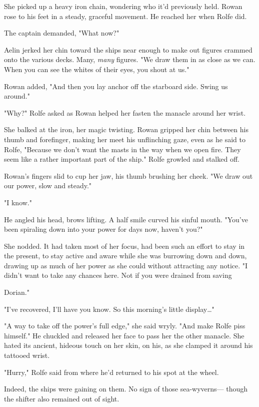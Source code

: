 She picked up a heavy iron chain, wondering who it'd previously held. Rowan rose to his feet in a steady, graceful movement. He reached her when Rolfe did.

The captain demanded, "What now?"

Aelin jerked her chin toward the ships near enough to make out figures crammed onto the various decks. Many, \emph{many} figures. "We draw them in as close as we can. When you can see the whites of their eyes, you shout at us."

Rowan added, "And then you lay anchor off the starboard side. Swing us around."

"Why?" Rolfe asked as Rowan helped her fasten the manacle around her wrist.

She balked at the iron, her magic twisting. Rowan gripped her chin between his thumb and forefinger, making her meet his unflinching gaze, even as he said to Rolfe, "Because we don't want the masts in the way when we open fire. They seem like a rather important part of the ship." Rolfe growled and stalked off.

Rowan's fingers slid to cup her jaw, his thumb brushing her cheek. "We draw out our power, slow and steady."

"I know."

He angled his head, brows lifting. A half smile curved his sinful mouth. "You've been spiraling down into your power for days now, haven't you?"

She nodded. It had taken most of her focus, had been such an effort to stay in the present, to stay active and aware while she was burrowing down and down, drawing up as much of her power as she could without attracting any notice. "I didn't want to take any chances here. Not if you were drained from saving

Dorian."

"I've recovered, I'll have you know. So this morning's little display\ldots"

"A way to take off the power's full edge," she said wryly. "And make Rolfe piss himself." He chuckled and released her face to pass her the other manacle. She hated its ancient, hideous touch on her skin, on his, as she clamped it around his tattooed wrist.

"Hurry," Rolfe said from where he'd returned to his spot at the wheel.

Indeed, the ships were gaining on them. No sign of those sea-wyverns--- though the shifter also remained out of sight.

